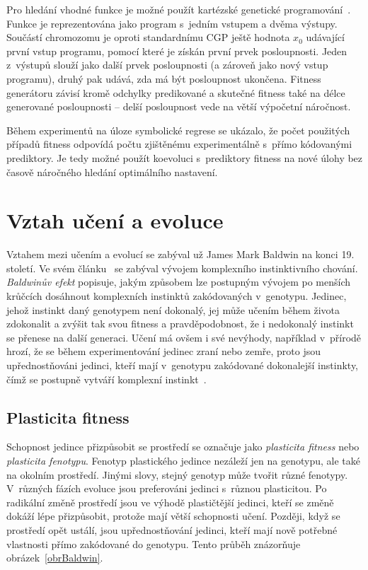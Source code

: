 Pro hledání vhodné funkce je možné použít kartézské genetické programování~\cite{SikuHulva}. Funkce je reprezentována jako program s~jedním vstupem a dvěma výstupy. Součástí chromozomu je oproti standardnímu CGP ještě hodnota $x_0$ udávající první vstup programu, pomocí které je získán první prvek posloupnosti. Jeden z~výstupů slouží jako další prvek posloupnosti (a zároveň jako nový vstup programu), druhý pak udává, zda má být posloupnost ukončena. Fitness generátoru závisí kromě odchylky predikované a skutečné fitness také na délce generované posloupnosti -- delší posloupnost vede na větší výpočetní náročnost.

Během experimentů na úloze symbolické regrese se ukázalo, že počet použitých případů fitness odpovídá počtu zjištěnému experimentálně s~přímo kódovanými prediktory. Je tedy možné použít koevoluci s~prediktory fitness na nové úlohy bez časově náročného hledání optimálního nastavení.


\section{Vztah učení a evoluce}
\label{secColearning}

Vztahem mezi učením a evolucí se zabýval už James Mark Baldwin na konci 19. století. Ve svém článku~\cite{Baldwin} se zabýval vývojem komplexního instinktivního chování. \emph{Baldwinův efekt} popisuje, jakým způsobem lze postupným vývojem po menších krůčcích dosáhnout komplexních instinktů zakódovaných v~genotypu. Jedinec, jehož instinkt daný genotypem není dokonalý, jej může učením během života zdokonalit a zvýšit tak svou fitness a pravděpodobnost, že i nedokonalý instinkt se přenese na další generaci. Učení má ovšem i své nevýhody, například v~přírodě hrozí, že se během experimentování jedinec zraní nebo zemře, proto jsou upřednostňováni jedinci, kteří mají v~genotypu zakódované dokonalejší instinkty, čímž se postupně vytváří komplexní instinkt~\cite{HowToShiftBias}.

\subsection{Plasticita fitness}
\label{secPlasticity}

Schopnost jedince přizpůsobit se prostředí se označuje jako \emph{plasticita fitness} nebo \emph{plasticita fenotypu}. Fenotyp plastického jedince nezáleží jen na genotypu, ale také na okolním prostředí. Jinými slovy, stejný genotyp může tvořit různé fenotypy. V~různých fázích evoluce jsou preferováni jedinci s~různou plasticitou. Po radikální změně prostředí jsou ve výhodě plastičtější jedinci, kteří se změně dokáží lépe přizpůsobit, protože mají větší schopnosti učení. Později, když se prostředí opět ustálí, jsou upřednostňování jedinci, kteří mají nově potřebné vlastnosti přímo zakódované do genotypu. Tento průběh znázorňuje obrázek~\ref{obrBaldwin}.

